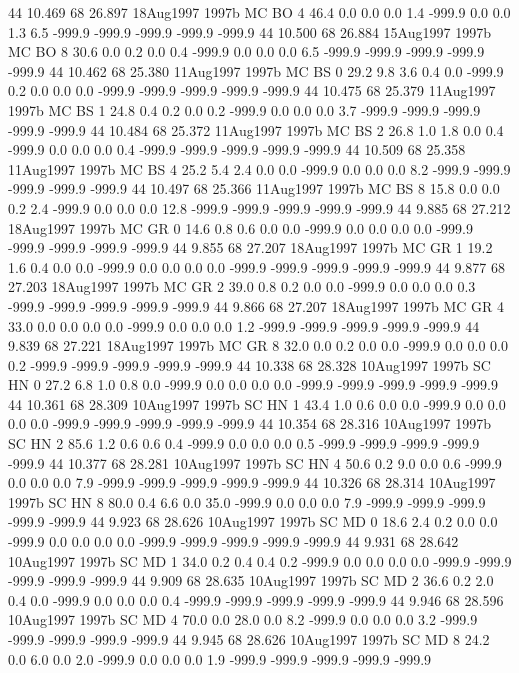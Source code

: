 44 10.469	68 26.897	18Aug1997	1997b	MC	BO	4	46.4	0.0	0.0	0.0	1.4	-999.9	0.0	0.0	1.3	6.5	-999.9	-999.9	-999.9	-999.9	-999.9
44 10.500	68 26.884	15Aug1997	1997b	MC	BO	8	30.6	0.0	0.2	0.0	0.4	-999.9	0.0	0.0	0.0	6.5	-999.9	-999.9	-999.9	-999.9	-999.9
44 10.462	68 25.380	11Aug1997	1997b	MC	BS	0	29.2	9.8	3.6	0.4	0.0	-999.9	0.2	0.0	0.0	0.0	-999.9	-999.9	-999.9	-999.9	-999.9
44 10.475	68 25.379	11Aug1997	1997b	MC	BS	1	24.8	0.4	0.2	0.0	0.2	-999.9	0.0	0.0	0.0	3.7	-999.9	-999.9	-999.9	-999.9	-999.9
44 10.484	68 25.372	11Aug1997	1997b	MC	BS	2	26.8	1.0	1.8	0.0	0.4	-999.9	0.0	0.0	0.0	0.4	-999.9	-999.9	-999.9	-999.9	-999.9
44 10.509	68 25.358	11Aug1997	1997b	MC	BS	4	25.2	5.4	2.4	0.0	0.0	-999.9	0.0	0.0	0.0	8.2	-999.9	-999.9	-999.9	-999.9	-999.9
44 10.497	68 25.366	11Aug1997	1997b	MC	BS	8	15.8	0.0	0.0	0.2	2.4	-999.9	0.0	0.0	0.0	12.8	-999.9	-999.9	-999.9	-999.9	-999.9
44 9.885	68 27.212	18Aug1997	1997b	MC	GR	0	14.6	0.8	0.6	0.0	0.0	-999.9	0.0	0.0	0.0	0.0	-999.9	-999.9	-999.9	-999.9	-999.9
44 9.855	68 27.207	18Aug1997	1997b	MC	GR	1	19.2	1.6	0.4	0.0	0.0	-999.9	0.0	0.0	0.0	0.0	-999.9	-999.9	-999.9	-999.9	-999.9
44 9.877	68 27.203	18Aug1997	1997b	MC	GR	2	39.0	0.8	0.2	0.0	0.0	-999.9	0.0	0.0	0.0	0.3	-999.9	-999.9	-999.9	-999.9	-999.9
44 9.866	68 27.207	18Aug1997	1997b	MC	GR	4	33.0	0.0	0.0	0.0	0.0	-999.9	0.0	0.0	0.0	1.2	-999.9	-999.9	-999.9	-999.9	-999.9
44 9.839	68 27.221	18Aug1997	1997b	MC	GR	8	32.0	0.0	0.2	0.0	0.0	-999.9	0.0	0.0	0.0	0.2	-999.9	-999.9	-999.9	-999.9	-999.9
44 10.338	68 28.328	10Aug1997	1997b	SC	HN	0	27.2	6.8	1.0	0.8	0.0	-999.9	0.0	0.0	0.0	0.0	-999.9	-999.9	-999.9	-999.9	-999.9
44 10.361	68 28.309	10Aug1997	1997b	SC	HN	1	43.4	1.0	0.6	0.0	0.0	-999.9	0.0	0.0	0.0	0.0	-999.9	-999.9	-999.9	-999.9	-999.9
44 10.354	68 28.316	10Aug1997	1997b	SC	HN	2	85.6	1.2	0.6	0.6	0.4	-999.9	0.0	0.0	0.0	0.5	-999.9	-999.9	-999.9	-999.9	-999.9
44 10.377	68 28.281	10Aug1997	1997b	SC	HN	4	50.6	0.2	9.0	0.0	0.6	-999.9	0.0	0.0	0.0	7.9	-999.9	-999.9	-999.9	-999.9	-999.9
44 10.326	68 28.314	10Aug1997	1997b	SC	HN	8	80.0	0.4	6.6	0.0	35.0	-999.9	0.0	0.0	0.0	7.9	-999.9	-999.9	-999.9	-999.9	-999.9
44 9.923	68 28.626	10Aug1997	1997b	SC	MD	0	18.6	2.4	0.2	0.0	0.0	-999.9	0.0	0.0	0.0	0.0	-999.9	-999.9	-999.9	-999.9	-999.9
44 9.931	68 28.642	10Aug1997	1997b	SC	MD	1	34.0	0.2	0.4	0.4	0.2	-999.9	0.0	0.0	0.0	0.0	-999.9	-999.9	-999.9	-999.9	-999.9
44 9.909	68 28.635	10Aug1997	1997b	SC	MD	2	36.6	0.2	2.0	0.4	0.0	-999.9	0.0	0.0	0.0	0.4	-999.9	-999.9	-999.9	-999.9	-999.9
44 9.946	68 28.596	10Aug1997	1997b	SC	MD	4	70.0	0.0	28.0	0.0	8.2	-999.9	0.0	0.0	0.0	3.2	-999.9	-999.9	-999.9	-999.9	-999.9
44 9.945	68 28.626	10Aug1997	1997b	SC	MD	8	24.2	0.0	6.0	0.0	2.0	-999.9	0.0	0.0	0.0	1.9	-999.9	-999.9	-999.9	-999.9	-999.9
